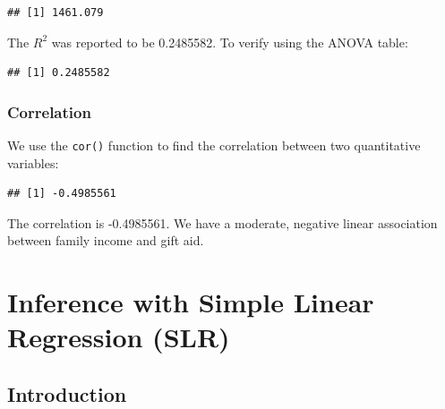 \documentclass[
]{book}
\newenvironment{Shaded}{\begin{snugshade}}{\end{snugshade}}
\newcommand{\DecValTok}[1]{\textcolor[rgb]{0.00,0.00,0.81}{#1}}
\newcommand{\DocumentationTok}[1]{\textcolor[rgb]{0.56,0.35,0.01}{\textbf{\textit{#1}}}}
\newcommand{\FunctionTok}[1]{\textcolor[rgb]{0.13,0.29,0.53}{\textbf{#1}}}
\newcommand{\NormalTok}[1]{#1}
\newcommand{\SpecialCharTok}[1]{\textcolor[rgb]{0.81,0.36,0.00}{\textbf{#1}}}
\newcommand{\StringTok}[1]{\textcolor[rgb]{0.31,0.60,0.02}{#1}}
\begin{document}
\begin{verbatim}
## [1] 1461.079
\end{verbatim}

The \(R^2\) was reported to be 0.2485582. To verify using the ANOVA table:

\begin{Shaded}
\end{Shaded}

\begin{verbatim}
## [1] 0.2485582
\end{verbatim}

\hypertarget{correlation-1}{%
\subsection*{Correlation}\label{correlation-1}}

We use the \texttt{cor()} function to find the correlation between two quantitative variables:

\begin{Shaded}
\end{Shaded}

\begin{verbatim}
## [1] -0.4985561
\end{verbatim}

The correlation is -0.4985561. We have a moderate, negative linear association between family income and gift aid.

\hypertarget{inf}{%
\chapter{Inference with Simple Linear Regression (SLR)}\label{inf}}

\hypertarget{introduction}{%
\section{Introduction}\label{introduction}}
\end{document}
